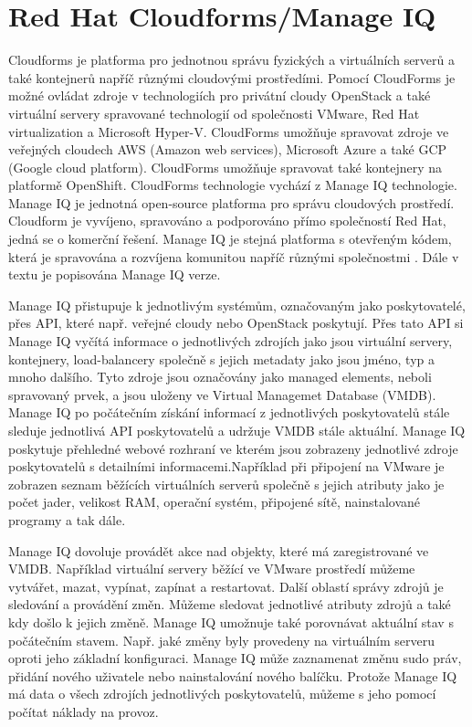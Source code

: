\section{Red Hat Cloudforms/Manage IQ}
Cloudforms je platforma pro jednotnou správu fyzických a virtuálních serverů a také kontejnerů napříč různými cloudovými prostředími. Pomocí CloudForms je možné ovládat zdroje v technologiích pro privátní cloudy OpenStack a také virtuální servery spravované technologií od společnosti VMware, Red Hat virtualization a Microsoft Hyper-V. CloudForms umožňuje spravovat zdroje ve veřejných cloudech AWS (Amazon web services), Microsoft Azure a také GCP (Google cloud platform). CloudForms umožňuje spravovat také kontejnery na platformě OpenShift. CloudForms technologie vychází z Manage IQ technologie. Manage IQ je jednotná open-source platforma pro správu cloudových prostředí. Cloudform je vyvíjeno, spravováno a podporováno přímo společností Red Hat, jedná se o komerční řešení. Manage IQ je stejná platforma s otevřeným kódem, která je spravována a rozvíjena komunitou napříč různými společnostmi \cite{manageiq}. Dále v textu je popisována Manage IQ verze.\par
    Manage IQ přistupuje k jednotlivým systémům, označovaným jako poskytovatelé, přes API, které např. veřejné cloudy nebo OpenStack poskytují. Přes tato API si Manage IQ vyčítá informace o jednotlivých zdrojích  jako jsou virtuální servery, kontejnery, load-balancery společně s jejich metadaty jako jsou jméno, typ a mnoho dalšího. Tyto zdroje jsou označovány jako managed elements, neboli spravovaný prvek, a jsou uloženy ve Virtual Managemet Database (VMDB). Manage IQ po počátečním získání informací z jednotlivých poskytovatelů stále sleduje jednotlivá API poskytovatelů a udržuje VMDB stále aktuální. Manage IQ poskytuje přehledné webové rozhraní ve kterém jsou zobrazeny jednotlivé zdroje poskytovatelů s detailními informacemi.\linebreak Například při připojení na VMware je zobrazen seznam běžících virtuálních serverů společně s jejich atributy jako je počet jader, velikost RAM, operační systém, připojené sítě, nainstalované programy a tak dále. \par
    Manage IQ dovoluje provádět akce nad objekty, které má zaregistrované ve VMDB. Například virtuální servery běžící ve VMware prostředí můžeme vytvářet, mazat, vypínat, zapínat a restartovat. Další oblastí správy zdrojů je sledování a provádění změn. Můžeme sledovat jednotlivé atributy zdrojů a také kdy došlo k jejich změně. Manage IQ umožnuje také porovnávat aktuální stav s počátečním stavem. Např. jaké změny byly provedeny na virtuálním serveru oproti jeho základní konfiguraci. Manage IQ může zaznamenat změnu sudo práv, přidání nového uživatele nebo nainstalování \linebreak nového balíčku. Protože Manage IQ má data o všech zdrojích jednotlivých poskytovatelů, můžeme s jeho pomocí počítat náklady na provoz.\par
